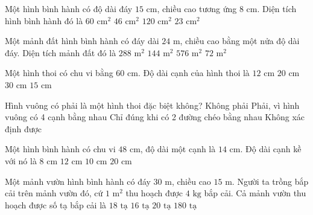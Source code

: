 \begin{ex} %
Một hình bình hành có độ dài đáy $15\text{ cm}$, chiều cao tương ứng $8\text{ cm}$. Diện tích hình bình hành đó là
\choice
{$60\text{ cm}^2$}
{$46\text{ cm}^2$}
{\True $120\text{ cm}^2$}
{$23\text{ cm}^2$}
\end{ex}

\begin{ex} %
Một mảnh đất hình bình hành có đáy dài $24\text{ m}$, chiều cao bằng một nửa độ dài đáy. Diện tích mảnh đất đó là
\choice
{\True $288\text{ m}^2$}
{$144\text{ m}^2$}
{$576\text{ m}^2$}
{$72\text{ m}^2$}
\end{ex}

\begin{ex} %
Một hình thoi có chu vi bằng $60\text{ cm}$. Độ dài cạnh của hình thoi là
\choice
{$12\text{ cm}$}
{$20\text{ cm}$}
{$30\text{ cm}$}
{\True $15\text{ cm}$}
\end{ex}

\begin{ex} %
Hình vuông có phải là một hình thoi đặc biệt không?
\choice
{Không phải}
{\True Phải, vì hình vuông có 4 cạnh bằng nhau}
{Chỉ đúng khi có 2 đường chéo bằng nhau}
{Không xác định được}
\end{ex}

\begin{ex} %
Một hình bình hành có chu vi $48\text{ cm}$, độ dài một cạnh là $14\text{ cm}$. Độ dài cạnh kề với nó là
\choice
{$8\text{ cm}$}
{$12\text{ cm}$}
{\True $10\text{ cm}$}
{$20\text{ cm}$}
\end{ex}

\begin{ex} %
Một mảnh vườn hình bình hành có đáy $30\text{ m}$, chiều cao $15\text{ m}$. Người ta trồng bắp cải trên mảnh vườn đó, cứ $1\text{ m}^2$ thu hoạch được $4\text{ kg}$ bắp cải. Cả mảnh vườn thu hoạch được số tạ bắp cải là
\choice
{\True $18\text{ tạ}$}
{$16\text{ tạ}$}
{$20\text{ tạ}$}
{$180\text{ tạ}$}
\end{ex}

